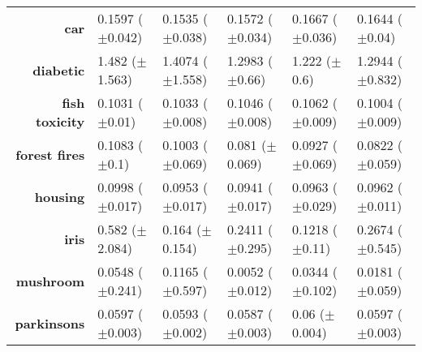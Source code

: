 \begin{table}[htb]
{\begin{tabular}{r|lllll}
			\textbf{car}                 & \cellcolor[rgb]{ 1,  .922,  .518}0.1597 ($\pm$0.042)        & \cellcolor[rgb]{ .388,  .745,  .482}0.1535 ($\pm$0.038) & \cellcolor[rgb]{ .749,  .847,  .502}0.1572 ($\pm$0.034) & \cellcolor[rgb]{ .973,  .412,  .42}0.1667 ($\pm$0.036) & \cellcolor[rgb]{ .984,  .58,  .455}0.1644 ($\pm$0.04)   \\
			\textbf{diabetic}            & \cellcolor[rgb]{ .973,  .412,  .42}1.482 ($\pm$1.563)       & \cellcolor[rgb]{ .984,  .62,  .463}1.4074 ($\pm$1.558)  & \cellcolor[rgb]{ 1,  .922,  .518}1.2983 ($\pm$0.66)     & \cellcolor[rgb]{ .388,  .745,  .482}1.222 ($\pm$0.6)   & \cellcolor[rgb]{ .969,  .91,  .514}1.2944 ($\pm$0.832)  \\
			\textbf{fish toxicity}       & \cellcolor[rgb]{ .961,  .91,  .514}0.1031 ($\pm$0.01)       & \cellcolor[rgb]{ 1,  .922,  .518}0.1033 ($\pm$0.008)    & \cellcolor[rgb]{ .988,  .694,  .475}0.1046 ($\pm$0.008) & \cellcolor[rgb]{ .973,  .412,  .42}0.1062 ($\pm$0.009) & \cellcolor[rgb]{ .388,  .745,  .482}0.1004 ($\pm$0.009) \\
			\textbf{forest fires}        & \cellcolor[rgb]{ .973,  .412,  .42}0.1083 ($\pm$0.1)        & \cellcolor[rgb]{ .988,  .675,  .471}0.1003 ($\pm$0.069) & \cellcolor[rgb]{ .388,  .745,  .482}0.081 ($\pm$0.069)  & \cellcolor[rgb]{ 1,  .922,  .518}0.0927 ($\pm$0.069)   & \cellcolor[rgb]{ .451,  .761,  .482}0.0822 ($\pm$0.059) \\
			\textbf{housing}             & \cellcolor[rgb]{ .973,  .412,  .42}0.0998 ($\pm$0.017)      & \cellcolor[rgb]{ .745,  .847,  .502}0.0953 ($\pm$0.017) & \cellcolor[rgb]{ .388,  .745,  .482}0.0941 ($\pm$0.017) & \cellcolor[rgb]{ 1,  .918,  .518}0.0963 ($\pm$0.029)   & \cellcolor[rgb]{ 1,  .922,  .518}0.0962 ($\pm$0.011)    \\
			\textbf{iris}                & \cellcolor[rgb]{ .973,  .412,  .42}0.582 ($\pm$2.084)       & \cellcolor[rgb]{ .604,  .804,  .494}0.164 ($\pm$0.154)  & \cellcolor[rgb]{ 1,  .922,  .518}0.2411 ($\pm$0.295)    & \cellcolor[rgb]{ .388,  .745,  .482}0.1218 ($\pm$0.11) & \cellcolor[rgb]{ 1,  .882,  .514}0.2674 ($\pm$0.545)    \\
			\textbf{mushroom}            & \cellcolor[rgb]{ .996,  .796,  .494}0.0548 ($\pm$0.241)     & \cellcolor[rgb]{ .973,  .412,  .42}0.1165 ($\pm$0.597)  & \cellcolor[rgb]{ .388,  .745,  .482}0.0052 ($\pm$0.012) & \cellcolor[rgb]{ 1,  .922,  .518}0.0344 ($\pm$0.102)   & \cellcolor[rgb]{ .655,  .82,  .494}0.0181 ($\pm$0.059)  \\
			\textbf{parkinsons}          & \cellcolor[rgb]{ 1,  .922,  .518}0.0597 ($\pm$0.003)        & \cellcolor[rgb]{ .769,  .855,  .502}0.0593 ($\pm$0.002) & \cellcolor[rgb]{ .388,  .745,  .482}0.0587 ($\pm$0.003) & \cellcolor[rgb]{ .973,  .412,  .42}0.06 ($\pm$0.004)   & \cellcolor[rgb]{ 1,  .918,  .518}0.0597 ($\pm$0.003)    \\

\end{tabular}}
\end{table}

